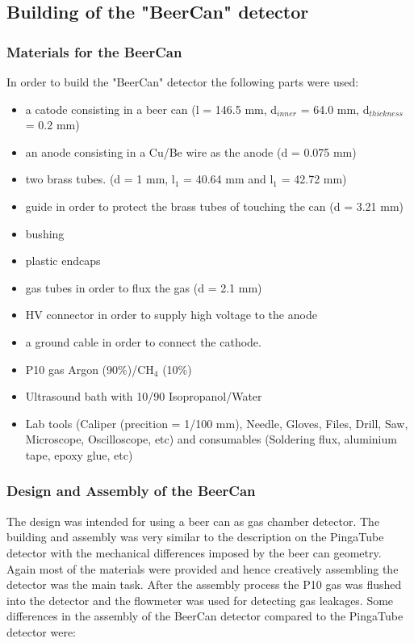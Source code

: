 \subsection{Building of the "BeerCan" detector}
\label{sec:building_beercan}

\subsubsection{Materials for the BeerCan}
\label{sec:materials_beercan}
In order to build the "BeerCan" detector the following parts were used:

\begin{itemize}
  \item a catode consisting in a beer can (l = 146.5 mm, d$_{inner}$ = 64.0 mm, d$_{thickness}$ = 0.2 mm)
  \item an anode consisting in a Cu/Be wire as the anode (d = 0.075 mm)
  \item two brass tubes. (d = 1 mm, l$_{1}$ = 40.64 mm and l$_{1}$ = 42.72 mm)
  \item guide in order to protect the brass tubes of touching the can (d = 3.21 mm)
  \item bushing
  \item plastic endcaps
  \item gas tubes in order to flux the gas (d = 2.1 mm)
  \item HV connector in order to supply high voltage to the anode 
  \item a ground cable in order to connect the cathode.
  \item P10 gas Argon (90\%)/CH$_{4}$ (10\%)  
  \item Ultrasound bath with 10/90 Isopropanol/Water
  \item Lab tools (Caliper (precition = 1/100 mm), Needle, Gloves, Files, Drill, Saw, Microscope, Oscilloscope, etc) and consumables (Soldering flux, aluminium tape, epoxy glue, etc) 
\end{itemize}
  
\subsubsection{Design and Assembly of the BeerCan}
\label{sec:design_and_assembly_beercan}
The design was intended for using a beer can as gas chamber detector. The building and assembly was very similar to the description on the PingaTube detector with the mechanical differences imposed by the beer can geometry.
Again most of the materials were provided and hence creatively assembling the detector was the main task. After the assembly process the P10 gas was flushed into the detector and the flowmeter was used for detecting gas leakages.
Some differences in the assembly of the BeerCan detector compared to the PingaTube detector were:

